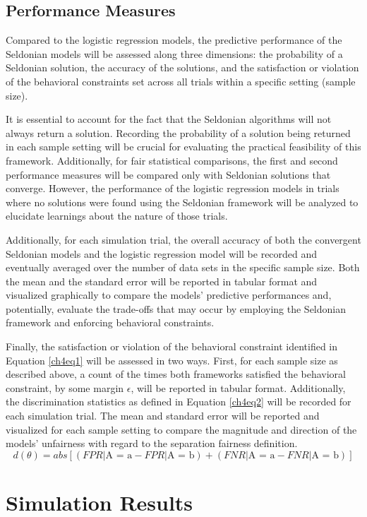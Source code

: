 \documentclass[12pt, twoside]{amherstthesis}
\begin{document}
\hypertarget{performancemeasures}{%
\subsection{Performance Measures}\label{performancemeasures}}

Compared to the logistic regression models, the predictive performance of the Seldonian models will be assessed along three dimensions: the probability of a Seldonian solution, the accuracy of the solutions, and the satisfaction or violation of the behavioral constraints set across all trials within a specific setting (sample size).

It is essential to account for the fact that the Seldonian algorithms will not always return a solution. Recording the probability of a solution being returned in each sample setting will be crucial for evaluating the practical feasibility of this framework. Additionally, for fair statistical comparisons, the first and second performance measures will be compared only with Seldonian solutions that converge. However, the performance of the logistic regression models in trials where no solutions were found using the Seldonian framework will be analyzed to elucidate learnings about the nature of those trials.

Additionally, for each simulation trial, the overall accuracy of both the convergent Seldonian models and the logistic regression model will be recorded and eventually averaged over the number of data sets in the specific sample size. Both the mean and the standard error will be reported in tabular format and visualized graphically to compare the models' predictive performances and, potentially, evaluate the trade-offs that may occur by employing the Seldonian framework and enforcing behavioral constraints.

Finally, the satisfaction or violation of the behavioral constraint identified in Equation \ref{ch4eq1} will be assessed in two ways. First, for each sample size as described above, a count of the times both frameworks satisfied the behavioral constraint, by some margin \(\epsilon\), will be reported in tabular format. Additionally, the discrimination statistics as defined in Equation \ref{ch4eq2} will be recorded for each simulation trial. The mean and standard error will be reported and visualized for each sample setting to compare the magnitude and direction of the models' unfairness with regard to the separation fairness definition.
\begin{equation}
\label{ch4eq2}
d(\theta) = abs[(FPR | \text{A = a} - FPR | \text{A = b}) + (FNR | \text{A = a} - FNR | \text{A = b})]
\end{equation}
\hypertarget{sim-results}{%
\section{Simulation Results}\label{sim-results}}
\end{document}
